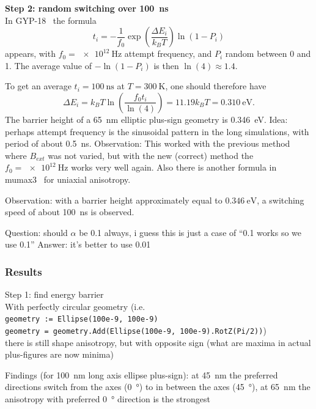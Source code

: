 \documentclass[10pt,a4paper]{article}
\newcommand{\code}[1]{\texttt{#1}}
\begin{document}
\textbf{Step 2: random switching over \SI{100}{\nano\second}} \\
In GYP-18~\cite{GYP-18} the formula
\begin{equation}
    t_i = -\frac{1}{f_0} \exp(\frac{\Delta E_i}{k_B T}) \ln(1-P_i)
\end{equation}
appears, with $f_0 = \SI{e12}{\hertz}$ attempt frequency, and $P_i$ random between 0 and 1. The average value of $-\ln(1-P_i)$ is then $\ln(4) \approx 1.4$.

To get an average $t_i = \SI{100}{\nano\second}$ at $T=\SI{300}{\kelvin}$, one should therefore have
\begin{equation}
    \Delta E_i = k_B T \ln(\frac{f_0 t_i}{\ln(4)}) = 11.19 k_B T = \SI{0.310}{\electronvolt} \mathrm{.}
\end{equation}
The barrier height of a \SI{65}{\nano\metre} elliptic plus-sign geometry is \SI{0.346}{\electronvolt}.
Idea: perhaps attempt frequency is the sinusoidal pattern in the long simulations, with period of about \SI{0.5}{\nano\second}. Observation: This worked with the previous method where $B_{ext}$ was not varied, but with the new (correct) method the $f_0 = \SI{e12}{\hertz}$ works very well again.
Also there is another formula in mumax3~\cite{MuMax3} for uniaxial anisotropy.

Observation: with a barrier height approximately equal to $\SI{0.346}{\electronvolt}$, a switching speed of about \SI{100}{\nano\second} is observed.

Question: should $\alpha$ be 0.1 always, i guess this is just a case of ``0.1 works so we use 0.1''
Answer: it's better to use 0.01

\subsubsection{Results}
Step 1: find energy barrier \\
With perfectly circular geometry (i.e. \\
\code{geometry := Ellipse(100e-9, 100e-9)} \\
\code{geometry = geometry.Add(Ellipse(100e-9, 100e-9).RotZ(Pi/2))}) \\
there is still shape anisotropy, but with opposite sign (what are maxima in actual plus-figures are now minima)

Findings (for \SI{100}{\nano\metre} long axis ellipse plus-sign):
at \SI{45}{\nano\metre} the preferred directions switch from the axes (\SI{0}{\degree}) to in between the axes (\SI{45}{\degree}),
at \SI{65}{\nano\metre} the anisotropy with preferred \SI{0}{\degree} direction is the strongest
\end{document}
